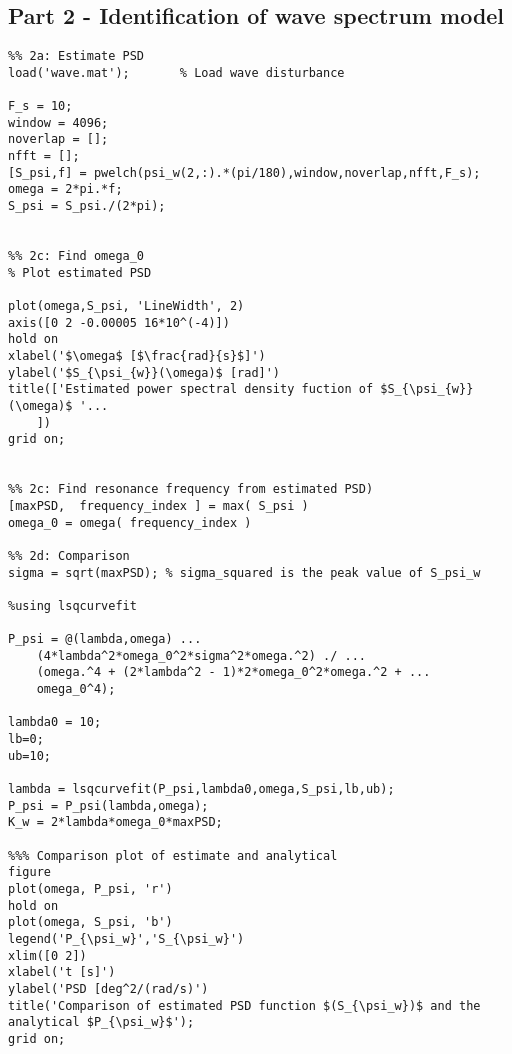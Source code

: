 \subsection{Part 2 - Identification of wave spectrum model}
\begin{lstlisting}
%% 2a: Estimate PSD
load('wave.mat');       % Load wave disturbance

F_s = 10;
window = 4096;
noverlap = [];
nfft = [];
[S_psi,f] = pwelch(psi_w(2,:).*(pi/180),window,noverlap,nfft,F_s);
omega = 2*pi.*f;
S_psi = S_psi./(2*pi);


%% 2c: Find omega_0
% Plot estimated PSD

plot(omega,S_psi, 'LineWidth', 2)
axis([0 2 -0.00005 16*10^(-4)])
hold on
xlabel('$\omega$ [$\frac{rad}{s}$]')
ylabel('$S_{\psi_{w}}(\omega)$ [rad]')
title(['Estimated power spectral density fuction of $S_{\psi_{w}}(\omega)$ '...
    ])
grid on;


%% 2c: Find resonance frequency from estimated PSD)
[maxPSD,  frequency_index ] = max( S_psi )
omega_0 = omega( frequency_index )

%% 2d: Comparison
sigma = sqrt(maxPSD); % sigma_squared is the peak value of S_psi_w

%using lsqcurvefit

P_psi = @(lambda,omega) ...
    (4*lambda^2*omega_0^2*sigma^2*omega.^2) ./ ...
    (omega.^4 + (2*lambda^2 - 1)*2*omega_0^2*omega.^2 + ...
    omega_0^4);

lambda0 = 10;
lb=0;
ub=10;

lambda = lsqcurvefit(P_psi,lambda0,omega,S_psi,lb,ub);
P_psi = P_psi(lambda,omega);
K_w = 2*lambda*omega_0*maxPSD;

%%% Comparison plot of estimate and analytical
figure
plot(omega, P_psi, 'r')
hold on
plot(omega, S_psi, 'b')
legend('P_{\psi_w}','S_{\psi_w}')
xlim([0 2])
xlabel('t [s]')
ylabel('PSD [deg^2/(rad/s)')
title('Comparison of estimated PSD function $(S_{\psi_w})$ and the analytical $P_{\psi_w}$');
grid on;

\end{lstlisting}

